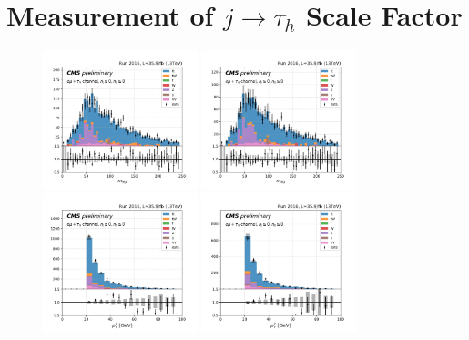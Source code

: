 

\chapter{Measurement of \texorpdfstring{$j \to \tau_h$}{Lg} Scale Factor}

\begin{figure}
    \centering
    \includegraphics[width=0.4\textwidth]{appendices/jetToTauhReweighting/figures/emutau_dilepton_mass_pickles_lltauTight.png}
    \includegraphics[width=0.4\textwidth]{appendices/jetToTauhReweighting/figures/emutau_dilepton_mass_pickles_lltauVTight.png}
    \includegraphics[width=0.4\textwidth]{appendices/jetToTauhReweighting/figures/emutau_tauPt_pickles_lltauTight.png}
    \includegraphics[width=0.4\textwidth]{appendices/jetToTauhReweighting/figures/emutau_tauPt_pickles_lltauVTight.png}

\end{figure}
